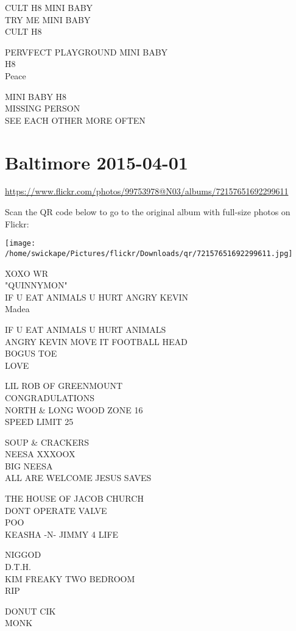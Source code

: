 \documentclass[10pt,letterpaper]{article}
\begin{document}
CULT H8 MINI BABY\\
TRY ME MINI BABY\\
CULT H8

PERVFECT PLAYGROUND MINI BABY\\
H8\\
Peace

MINI BABY H8\\
MISSING PERSON\\
SEE EACH OTHER MORE OFTEN
\pagebreak

\section*{Baltimore 2015-04-01}

\url{https://www.flickr.com/photos/99753978@N03/albums/72157651692299611}

Scan the QR code below to go to the original album with full-size photos on Flickr:

\texttt{[image: /home/swickape/Pictures/flickr/Downloads/qr/72157651692299611.jpg]}
\pagebreak

XOXO WR\\
"QUINNYMON"\\
IF U EAT ANIMALS U HURT ANGRY KEVIN\\
Madea

IF U EAT ANIMALS U HURT ANIMALS\\
ANGRY KEVIN MOVE IT FOOTBALL HEAD\\
BOGUS TOE\\
LOVE

LIL ROB OF GREENMOUNT\\
CONGRADULATIONS\\
NORTH \& LONG WOOD ZONE 16\\
SPEED LIMIT 25

SOUP \& CRACKERS\\
NEESA XXXOOX\\
BIG NEESA\\
ALL ARE WELCOME JESUS SAVES

THE HOUSE OF JACOB CHURCH\\
DONT OPERATE VALVE\\
POO\\
KEASHA {-}N{-} JIMMY 4 LIFE

NIGGOD\\
D.T.H.\\
KIM FREAKY TWO BEDROOM\\
RIP

DONUT CIK\\
MONK
\pagebreak
\end{document}
